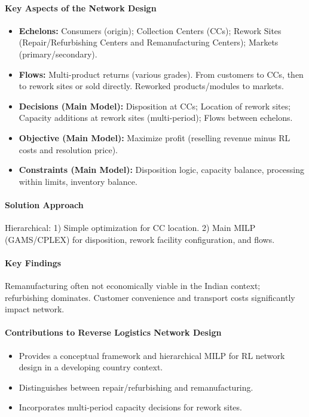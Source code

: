 \paragraph{Key Aspects of the Network Design}
\begin{itemize}
    \item \textbf{Echelons:} Consumers (origin); Collection Centers (CCs); Rework Sites (Repair/Refurbishing Centers and Remanufacturing Centers); Markets (primary/secondary).
    \item \textbf{Flows:} Multi-product returns (various grades). From customers to CCs, then to rework sites or sold directly. Reworked products/modules to markets.
    \item \textbf{Decisions (Main Model):} Disposition at CCs; Location of rework sites; Capacity additions at rework sites (multi-period); Flows between echelons.
    \item \textbf{Objective (Main Model):} Maximize profit (reselling revenue minus RL costs and resolution price).
    \item \textbf{Constraints (Main Model):} Disposition logic, capacity balance, processing within limits, inventory balance.
\end{itemize}
\paragraph{Solution Approach} Hierarchical: 1) Simple optimization for CC location. 2) Main MILP (GAMS/CPLEX) for disposition, rework facility configuration, and flows.
\paragraph{Key Findings} Remanufacturing often not economically viable in the Indian context; refurbishing dominates. Customer convenience and transport costs significantly impact network.
\paragraph{Contributions to Reverse Logistics Network Design}
\begin{itemize}
    \item Provides a conceptual framework and hierarchical MILP for RL network design in a developing country context.
    \item Distinguishes between repair/refurbishing and remanufacturing.
    \item Incorporates multi-period capacity decisions for rework sites.
\end{itemize}
